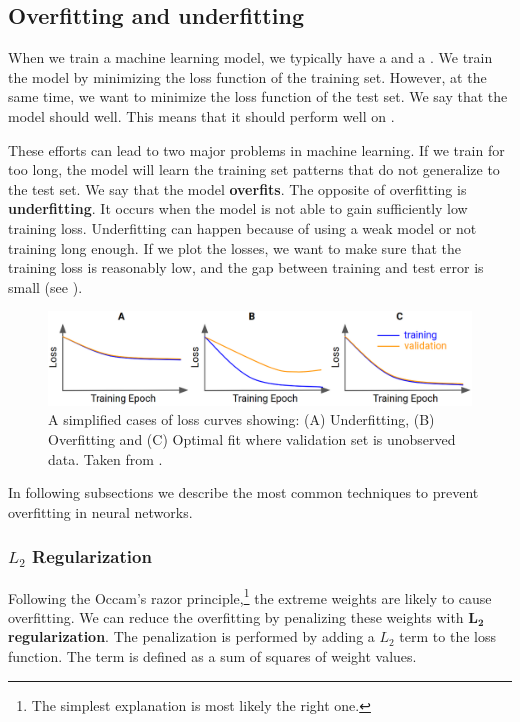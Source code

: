 
\subsection{Overfitting and underfitting}
When we train a machine learning model, we typically have a 
and a . We train the model by minimizing the loss function of the
training set. However, at the same time, we want to minimize the loss function of
the test set. We say that the model should  well. This means
that it should perform well on .

These efforts can lead to two major problems in machine learning. If we train
for too long, the model will learn the training set patterns that do not
generalize to the test set. We say that the model \textbf{overfits}. The
opposite of overfitting is \textbf{underfitting}. It occurs when the model is
not able to gain sufficiently low training loss. Underfitting can happen because
of using a weak model or not training long enough. If we plot the losses, we
want to make sure that the training loss is reasonably low, and the gap between
training and test error is small (see ).

\begin{figure}[h]
    \centering
    \includegraphics[width=\linewidth]{Sources/Figures/fitting.png}
    \caption{A simplified cases of loss curves showing:
        (A) Underfitting, (B) Overfitting and (C) Optimal fit where validation
        set is unobserved data. Taken from
        \cite{bileschi2020deep}.}
    \label{fig:loss_plot}
\end{figure}

In following subsections we describe the most common techniques to prevent
overfitting in neural networks.

\subsubsection{$L_2$ Regularization}
Following the Occam's razor principle,\footnote{The simplest explanation is most
    likely the right one.} the extreme weights are likely to cause overfitting. We
can reduce the overfitting by penalizing these weights with $\boldsymbol{L_2}$
\textbf{regularization}. The penalization is performed by adding a $L_2$ term to
the loss function. The term is defined as a sum of squares of weight values.

